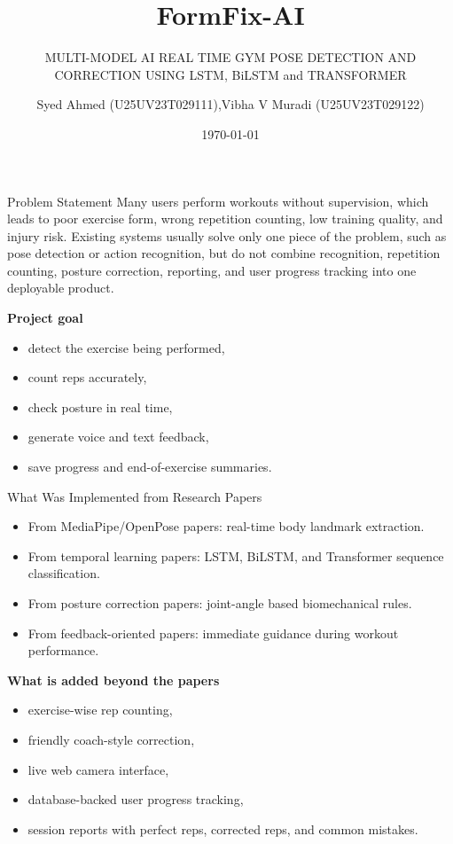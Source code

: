 \documentclass[aspectratio=169]{beamer}
\title{FormFix-AI}
\subtitle{MULTI-MODEL AI REAL TIME GYM POSE DETECTION AND CORRECTION USING LSTM, BiLSTM and TRANSFORMER}
\institute{Department of CSE, UVCE \\ Mini Project Presentation \\ Submitted to: Dr. Champa H N}
\author{Syed Ahmed (U25UV23T029111),Vibha V Muradi (U25UV23T029122) }
\institute{Mini Project Presentation}
\date{\today}
\begin{document}
\begin{frame}
  \titlepage
\end{frame}

\begin{frame}{Problem Statement}
\justifying
Many users perform workouts without supervision, which leads to poor exercise form, wrong repetition counting, low training quality, and injury risk. Existing systems usually solve only one piece of the problem, such as pose detection or action recognition, but do not combine recognition, repetition counting, posture correction, reporting, and user progress tracking into one deployable product.

\vspace{0.3cm}
\textbf{Project goal}
\begin{itemize}
  \item detect the exercise being performed,
  \item count reps accurately,
  \item check posture in real time,
  \item generate voice and text feedback,
  \item save progress and end-of-exercise summaries.
\end{itemize}
\end{frame}

\begin{frame}{What Was Implemented from Research Papers}
\small
\begin{itemize}
  \item From MediaPipe/OpenPose papers: real-time body landmark extraction.
  \item From temporal learning papers: LSTM, BiLSTM, and Transformer sequence classification.
  \item From posture correction papers: joint-angle based biomechanical rules.
  \item From feedback-oriented papers: immediate guidance during workout performance.
\end{itemize}

\vspace{0.2cm}
\textbf{What is added beyond the papers}
\begin{itemize}
  \item exercise-wise rep counting,
  \item friendly coach-style correction,
  \item live web camera interface,
  \item database-backed user progress tracking,
  \item session reports with perfect reps, corrected reps, and common mistakes.
\end{itemize}
\end{frame}
\end{document}
